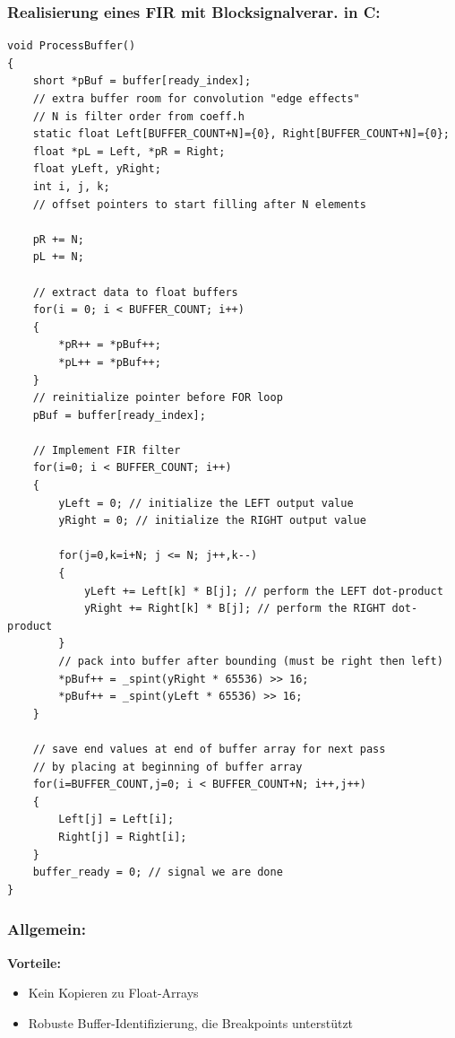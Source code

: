 \documentclass[10pt,a4paper]{article}
\begin{document}
\subsubsection{Realisierung eines FIR mit Blocksignalverar. in C:}
\begin{minipage}{0.5\textwidth}
\begin{verbatim}
void ProcessBuffer()
{
    short *pBuf = buffer[ready_index];
    // extra buffer room for convolution "edge effects"
    // N is filter order from coeff.h
    static float Left[BUFFER_COUNT+N]={0}, Right[BUFFER_COUNT+N]={0};
    float *pL = Left, *pR = Right;
    float yLeft, yRight;
    int i, j, k;
    // offset pointers to start filling after N elements
    
    pR += N;
    pL += N;

    // extract data to float buffers
    for(i = 0; i < BUFFER_COUNT; i++) 
    { 
        *pR++ = *pBuf++;
        *pL++ = *pBuf++;
    }
    // reinitialize pointer before FOR loop
    pBuf = buffer[ready_index];

    // Implement FIR filter
    for(i=0; i < BUFFER_COUNT; i++) 
    {
        yLeft = 0; // initialize the LEFT output value
        yRight = 0; // initialize the RIGHT output value

        for(j=0,k=i+N; j <= N; j++,k--) 
        {
            yLeft += Left[k] * B[j]; // perform the LEFT dot-product
            yRight += Right[k] * B[j]; // perform the RIGHT dot-product
        }
        // pack into buffer after bounding (must be right then left)
        *pBuf++ = _spint(yRight * 65536) >> 16;
        *pBuf++ = _spint(yLeft * 65536) >> 16;
    }

    // save end values at end of buffer array for next pass
    // by placing at beginning of buffer array
    for(i=BUFFER_COUNT,j=0; i < BUFFER_COUNT+N; i++,j++) 
    {
        Left[j] = Left[i];
        Right[j] = Right[i];
    }
    buffer_ready = 0; // signal we are done
}
\end{verbatim}
\end{minipage}
\newpage
\subsubsection{Allgemein:}
\textbf{Vorteile:}
\begin{itemize}
  \item Kein Kopieren zu Float-Arrays
  \item Robuste Buffer-Identifizierung, die Breakpoints unterstützt
\end{itemize}
\end{document}
